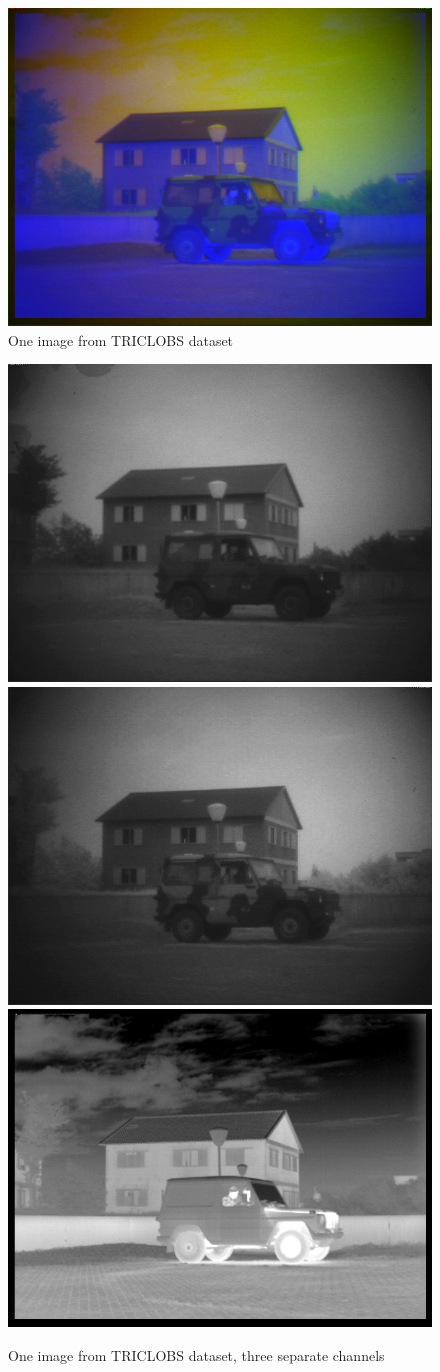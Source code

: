 \documentclass[10pt,twocolumn,letterpaper]{article}
\begin{document}
\begin{figure}
	\includegraphics[width=\columnwidth]{images/TRI_A1/fusion.png}
	\caption{One image from TRICLOBS dataset}\label{fig:triclobs-fusion}
\end{figure}
\begin{figure}
	\includegraphics[width=0.325\columnwidth]{images/TRI_A1/ch1.png}
	\includegraphics[width=0.325\columnwidth]{images/TRI_A1/ch2.png}
	\includegraphics[width=0.325\columnwidth]{images/TRI_A1/ch3.png}
	\caption{One image from TRICLOBS dataset, three separate channels}\label{fig:triclobs-fusion-channels}
\end{figure}
\end{document}
